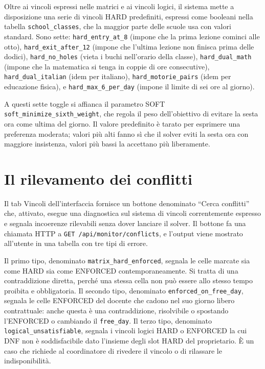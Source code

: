 Oltre ai vincoli espressi nelle matrici e ai vincoli logici,
il sistema mette a disposizione una serie di vincoli HARD
predefiniti, espressi come booleani nella tabella
\texttt{school\_classes}, che la maggior parte delle scuole
usa con valori standard. Sono sette: \texttt{hard\_entry\_at\_8}
(impone che la prima lezione cominci alle otto),
\texttt{hard\_exit\_after\_12} (impone che l'ultima lezione
non finisca prima delle dodici), \texttt{hard\_no\_holes}
(vieta i buchi nell'orario della classe),
\texttt{hard\_dual\_math} (impone che la matematica si
tenga in coppie di ore consecutive), \texttt{hard\_dual\_italian}
(idem per italiano), \texttt{hard\_motorie\_pairs} (idem per
educazione fisica), e \texttt{hard\_max\_6\_per\_day}
(impone il limite di sei ore al giorno).

A questi sette toggle si affianca il parametro SOFT
\texttt{soft\_minimize\_sixth\_weight}, che regola il peso
dell'obiettivo di evitare la sesta ora come ultima del
giorno. Il valore predefinito \`e tarato per esprimere una
preferenza moderata; valori pi\`u alti fanno s\`i che il
solver eviti la sesta ora con maggiore insistenza, valori
pi\`u bassi la accettano pi\`u liberamente.

\section{Il rilevamento dei conflitti}

Il tab Vincoli dell'interfaccia fornisce un bottone
denominato ``Cerca conflitti'' che, attivato, esegue una
diagnostica sul sistema di vincoli correntemente espresso e
segnala incoerenze rilevabili senza dover lanciare il
solver. Il bottone fa una chiamata HTTP a
\texttt{GET /api/monitor/conflicts}, e l'output viene mostrato
all'utente in una tabella con tre tipi di errore.

Il primo tipo, denominato \texttt{matrix\_hard\_enforced},
segnala le celle marcate sia come HARD sia come ENFORCED
contemporaneamente. Si tratta di una contraddizione
diretta, perch\'e una stessa cella non pu\`o essere allo
stesso tempo proibita e obbligatoria. Il secondo tipo,
denominato \texttt{enforced\_on\_free\_day}, segnala le
celle ENFORCED del docente che cadono nel suo giorno libero
contrattuale: anche questa \`e una contraddizione,
risolvibile o spostando l'ENFORCED o cambiando il
\texttt{free\_day}. Il terzo tipo, denominato
\texttt{logical\_unsatisfiable}, segnala i vincoli logici
HARD o ENFORCED la cui DNF non \`e soddisfacibile dato
l'insieme degli slot HARD del proprietario. \`E un caso che
richiede al coordinatore di rivedere il vincolo o di
rilassare le indisponibilit\`a.

